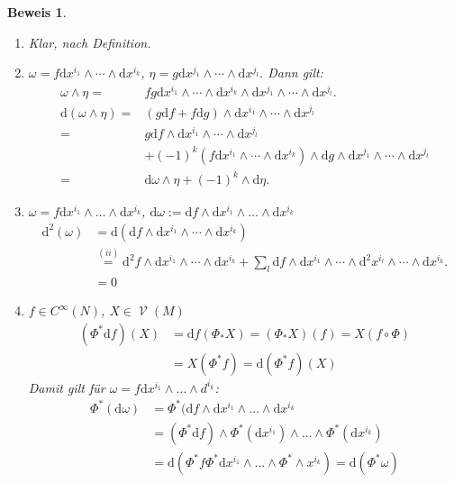 \documentclass[paper=A4, twoside, chapterprefix=true, bibliography=totoc, headsepline]{scrbook}
\DeclareMathOperator{\calV}{\mathcal{V}}
\newcommand{\dop}{\mathrm{d}}
\theoremstyle{plain}
\theoremstyle{nonumberplain}
\newtheorem{bew}{Beweis}
\theoremstyle{empty}
\theoremstyle{break}
\begin{document}
\begin{bew}
\begin{enumerate}[label=(\roman*),leftmargin=*,widest=iii]
\item
	Klar, nach Definition.
\item
	$\omega = f\dop x^{i_1} \wedge \cdots \wedge \dop x^{i_k}$, $\eta = g \dop x^{j_1} \wedge \cdots \wedge \dop x^{j_l}$. Dann gilt:
	\begin{align*}
		\omega \wedge \eta ={}& fg \dop x^{i_1} \wedge \cdots \wedge \dop x^{i_k} \wedge \dop x^{j_1} \wedge \cdots \wedge \dop x^{j_l}.\\
		\dop (\omega \wedge \eta) ={}& (g \dop f + f \dop g) \wedge \dop x^{i_1} \wedge \cdots \wedge \dop x^{j_l}\\
		={} & g \dop f \wedge \dop x^{i_1} \wedge \cdots \wedge \dop x^{j_l}\\
		& + (-1)^k(f \dop x^{i_1} \wedge \cdots \wedge \dop x^{i_k}) \wedge \dop g \wedge \dop x^{j_1} \wedge \cdots \wedge \dop x^{j_l}\\
		={} & \dop \omega \wedge \eta + (-1)^k \wedge \dop \eta.
	\end{align*}
\item
	$\omega = f \dop x^{i_1} \wedge \ldots  \wedge \dop x^{i_k}$, $\dop \omega := \dop f \wedge \dop x^{i_1} \wedge \ldots \wedge \dop x^{i_k}$
	\begin{align*}
		\dop^2(\omega) & = \dop(\dop f \wedge \dop x^{i_1} \wedge \cdots \wedge \dop x^{i_k})\\
		& \overset{(ii)}{=} \dop^2f \wedge \dop x^{i_1} \wedge \cdots \wedge \dop x^{i_k} + \sum_l \dop f \wedge \dop x^{i_1} \wedge \cdots \wedge \dop^2x^{i_l} \wedge \cdots \wedge \dop x^{i_k}.\\
		& = 0
	\end{align*}
\item
	$f \in C^{\infty}(N)$, $X \in \calV(M)$
	\begin{align*}
		(\Phi^* \dop f)(X) &= \dop f(\Phi_* X) = (\Phi_* X)(f) = X(f \circ \Phi)\\
		&= X(\Phi^* f) = \dop (\Phi^* f)(X)
	\end{align*}
	Damit gilt f\"ur $\omega = f \dop x^{i_1} \wedge \ldots \wedge d^{i_k}$:
	\begin{align*}
		\Phi^*(\dop \omega) &= \Phi^*(\dop f \wedge \dop x^{i_1} \wedge \ldots \wedge \dop x^{i_k}\\
		&= (\Phi^* \dop f) \wedge \Phi^*(\dop x^{i_1}) \wedge \ldots \wedge \Phi^*(\dop x^{i_k})\\
		&= \dop (\Phi^* f \Phi^* \dop x^{i_1} \wedge \ldots \wedge \Phi^* \wedge x^{i_k}) = \dop (\Phi^* \omega)
	\end{align*}
\end{enumerate}\end{bew}
\end{document}
